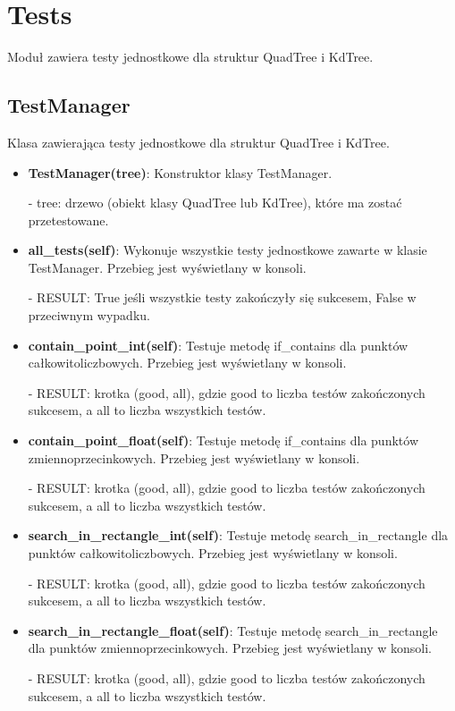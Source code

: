 \documentclass{lab}
\begin{document}
\section{Tests}
Moduł zawiera testy jednostkowe dla struktur QuadTree i KdTree.
\subsection{TestManager}
Klasa zawierająca testy jednostkowe dla struktur QuadTree i KdTree.
\begin{itemize}
  \item \textbf{TestManager(tree)}:
  Konstruktor klasy TestManager.

  - tree: drzewo (obiekt klasy QuadTree lub KdTree), które ma zostać przetestowane.

  \item \textbf{all\_tests(self)}:
  Wykonuje wszystkie testy jednostkowe zawarte w klasie TestManager. Przebieg jest wyświetlany w konsoli.

  - RESULT: True jeśli wszystkie testy zakończyły się sukcesem, False w przeciwnym wypadku.

  \item \textbf{contain\_point\_int(self)}:
  Testuje metodę if\_contains dla punktów całkowitoliczbowych. Przebieg jest wyświetlany w konsoli.

  - RESULT: krotka (good, all), gdzie good to liczba testów zakończonych sukcesem, a all to liczba wszystkich testów.

  \item \textbf{contain\_point\_float(self)}:
  Testuje metodę if\_contains dla punktów zmiennoprzecinkowych. Przebieg jest wyświetlany w konsoli.

  - RESULT: krotka (good, all), gdzie good to liczba testów zakończonych sukcesem, a all to liczba wszystkich testów.

  \item \textbf{search\_in\_rectangle\_int(self)}:
  Testuje metodę search\_in\_rectangle dla punktów całkowitoliczbowych. Przebieg jest wyświetlany w konsoli.

  - RESULT: krotka (good, all), gdzie good to liczba testów zakończonych sukcesem, a all to liczba wszystkich testów.

  \item \textbf{search\_in\_rectangle\_float(self)}:
  Testuje metodę search\_in\_rectangle dla punktów zmiennoprzecinkowych. Przebieg jest wyświetlany w konsoli.

  - RESULT: krotka (good, all), gdzie good to liczba testów zakończonych sukcesem, a all to liczba wszystkich testów.
\end{itemize}
\end{document}
